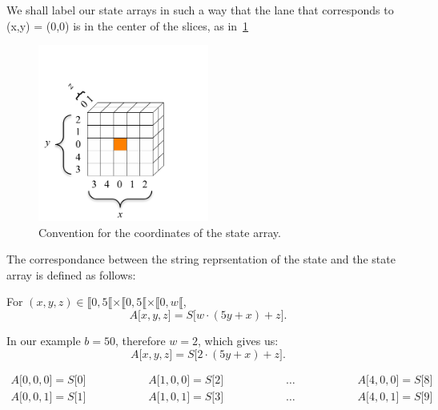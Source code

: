 We shall label our state arrays in such a way that the lane that corresponds to (x,y) = (0,0) is in the center of the slices, as in~\ref{fig:LabelStateArray}

\begin{figure}[H]
\centering
\includegraphics[width=0.5\textwidth]{img/LabelStateArray.png}
\caption{\label{fig:LabelStateArray}Convention for the coordinates of the state array.}
\end{figure}

The correspondance between the string reprsentation of the state and the state array is defined as follows:

For $(x,y,z) \in \llbracket 0,5 \llbracket \times \llbracket 0,5 \llbracket \times \llbracket 0,w \llbracket$,
$$A\lbrack x,y,z \rbrack=S\lbrack w\cdot (5y+x)+z \rbrack.$$



In our example $b=50$, therefore $w=2$, which gives us:
$$A\lbrack x,y,z \rbrack=S\lbrack 2\cdot (5y+x)+z \rbrack.$$

\begin{equation}
\begin{aligned}
A \lbrack 0,0,0\rbrack = S\lbrack 0 \rbrack & \hspace{2cm} A \lbrack 1,0,0\rbrack = S\lbrack 2 \rbrack & \hspace{2cm} \ldots & \hspace{2cm} A \lbrack 4,0,0\rbrack = S\lbrack 8 \rbrack\\
A \lbrack 0,0,1\rbrack = S\lbrack 1 \rbrack & \hspace{2cm} A \lbrack 1,0,1\rbrack = S\lbrack 3 \rbrack & \hspace{2cm} \ldots & \hspace{2cm} A \lbrack 4,0,1\rbrack = S\lbrack 9 \rbrack\\
\end{aligned}
\end{equation}

